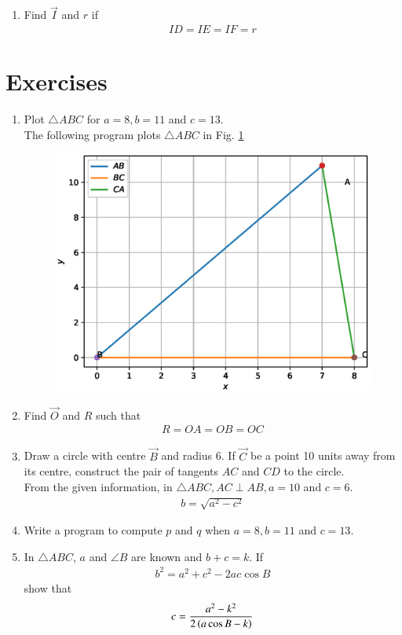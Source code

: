 \documentclass[journal,12pt,twocolumn]{IEEEtran}
\renewcommand\thesection{\arabic{section}}
\begin{document}
\begin{enumerate}[label=\thesection.\arabic*
,ref=\thesection.\theenumi]
\item Find $\vec{I}$ and $r$ if 
\begin{align}
ID = IE = IF =r
\end{align}

\end{enumerate}
%
%
\section{Exercises}
\begin{enumerate}[label=\thesection.\arabic*
,ref=\thesection.\theenumi]
\item Plot $\triangle ABC$ for $a = 8, b = 11$ and $c = 13$. 
\\
\solution The following program plots $\triangle ABC$ in Fig. \ref{fig:triangle}

%
\begin{figure}
\centering
\includegraphics[width=\columnwidth]{./figs/triangle.eps}
\caption{}
\label{fig:triangle}
\end{figure}
\item Find $\vec{O}$ and $R$ such that 
\begin{align}
R = OA = OB = OC
\end{align}
\item Draw a circle with centre $\vec{B}$ and radius 6.  If $\vec{C}$ be  a point 10 units  away from its 
centre, construct the pair of tangents $AC$ and $CD$ to the 
circle.
\\
\solution From the given information, in $\triangle ABC, AC \perp AB, a = 
10$ and $c = 6$.
\begin{align}
b =  \sqrt{a^2-c^2}
\end{align}
\item Write a program to compute $p$ and $q$ when $a = 8, b = 11$ and $c = 13$. 
\item In $\triangle ABC$,  $a$ and  $\angle B$ are known and $b+c = k$. If 
\begin{align}
\label{eq:cos_formula}
b^2  = a^2+c^2- 2ac \cos B
\end{align}
%
show that
\begin{align}
c = \frac{ a^2-k^2 }{2\left(a \cos B -k\right)}
\end{align}


\end{enumerate}
\end{document}
